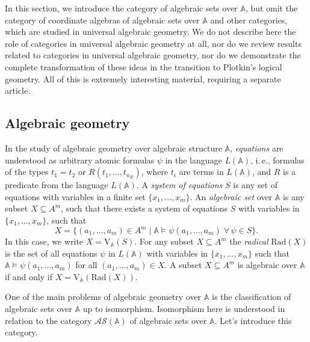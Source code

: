 \documentclass[12pt]{article}
\theoremstyle{definition}
\def\MA{{\mathbb{A}}}
\def\AS{{\mathcal{AS}}}
\def\Rad{{\mathrm{Rad}}}
\def\V{{\mathrm{V}}}
\begin{document}
In this section, we introduce the category of algebraic sets over $\MA$, but omit the category of coordinate algebras of algebraic sets over $\MA$ and other categories, which are studied in universal algebraic geometry. 
We do not describe here the role of categories in universal algebraic geometry at all, nor do we review results related to categories in universal algebraic geometry, nor do we demonstrate the complete transformation of these ideas in the transition to Plotkin's logical geometry. All of this is extremely interesting material, requiring a separate article.

\subsection{Algebraic geometry}\label{subsec:AG}

In the study of algebraic geometry over algebraic structure $\MA$, {\em equations} are understood as arbitrary atomic formulas $\psi$ in the language $L(\MA)$, i.\,e., formulas of the types $t_1=t_2$ or $R(t_1,\ldots,t_{n_R})$, where $t_i$ are terms in $L(\MA)$, and $R$ is a predicate from the language $L(\MA)$. A {\em system of equations} $S$ is any set of equations with variables in a finite set $\{x_1,\ldots,x_m\}$. 
An {\em algebraic set} over $\MA$ is any subset $X\subseteq A^m$, such that there exists a system of equations $S$ with variables in $\{x_1,\ldots,x_m\}$, such that 
\begin{equation}\label{eq:V(S)}
 X=\{(a_1,\ldots, a_m)\in A^m \mid \MA\models\psi (a_1,\ldots,a_m) \; \forall\, \psi \in S\}.   
\end{equation}
In this case, we write $X=\V_\MA(S)$. For any subset $X\subseteq A^m$ the {\em radical} $\Rad(X)$ is the set of all equations $\psi$ in $L(\MA)$ with variables in $\{x_1,\ldots,x_m\}$ such that $\MA\models\psi (a_1,\ldots,a_m)$ for all $(a_1,\ldots, a_m)\in X$. A subset $X\subseteq A^m$ is algebraic over $\MA$ if and only if $X=\V_\MA(\Rad (X))$.

One of the main problems of algebraic geometry over $\MA$ is the classification of algebraic sets over $\MA$ up to isomorphism. Isomorphism here is understood in relation to the category $\AS(\MA)$ of algebraic sets over $\MA$. Let's introduce this category.
\end{document}

